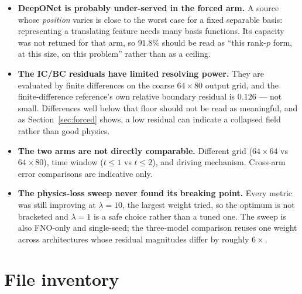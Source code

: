 \documentclass[11pt,a4paper]{article}
\begin{document}
\begin{itemize}[leftmargin=*,itemsep=3pt]
capacity, not purely architecture. A parameter-matched comparison has not been
run.
\item \textbf{DeepONet is probably under-served in the forced arm.} A source
whose \emph{position} varies is close to the worst case for a fixed separable
basis: representing a translating feature needs many basis functions. Its
capacity was not retuned for that arm, so $91.8\%$ should be read as ``this
rank-$p$ form, at this size, on this problem'' rather than as a ceiling.
\item \textbf{The IC/BC residuals have limited resolving power.} They are
evaluated by finite differences on the coarse $64\times80$ output grid, and the
finite-difference reference's own relative boundary residual is $0.126$ --- not
small. Differences well below that floor should not be read as meaningful, and
as Section~\ref{sec:forced} shows, a low residual can indicate a collapsed field
rather than good physics.
\item \textbf{The two arms are not directly comparable.} Different grid
($64\times64$ vs $64\times80$), time window ($t\le1$ vs $t\le2$), and driving
mechanism. Cross-arm error comparisons are indicative only.
\item \textbf{The physics-loss sweep never found its breaking point.} Every
metric was still improving at $\lambda=10$, the largest weight tried, so the
optimum is not bracketed and $\lambda=1$ is a safe choice rather than a tuned
one. The sweep is also FNO-only and single-seed; the three-model comparison
reuses one weight across architectures whose residual magnitudes differ by
roughly $6\times$.
\end{itemize}

\section{File inventory}
\end{document}
